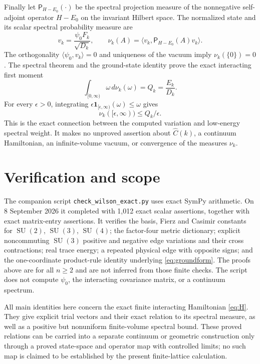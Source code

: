 \documentclass[11pt]{article}
\theoremstyle{definition}
\newcommand{\SU}{\operatorname{SU}}
\begin{document}
Finally let $\mathsf P_{H-E_0}(\cdot)$ be the spectral projection measure
of the nonnegative self-adjoint operator $H-E_0$ on the invariant
Hilbert space. The normalized state and its scalar spectral probability
measure are
\begin{equation}\label{eq:spectralmeasure}
 v_k=\frac{\psi_0F_k}{\sqrt{D_k}},\qquad
 \nu_k(A)=\langle v_k,\mathsf P_{H-E_0}(A)v_k\rangle.
\end{equation}
The orthogonality $\langle\psi_0,v_k\rangle=0$ and uniqueness of the
vacuum imply $\nu_k(\{0\})=0$. The spectral theorem and the ground-state
identity prove the exact interacting first moment
\begin{equation}\label{eq:firstmoment}
 \int_{[0,\infty)}\omega\,d\nu_k(\omega)=Q_k=\frac{E_k}{D_k}.
\end{equation}
For every $\epsilon>0$, integrating
$\epsilon\mathbf 1_{[\epsilon,\infty)}(\omega)\leq\omega$ gives
\[
 \nu_k([\epsilon,\infty))\leq Q_k/\epsilon.
\]
This is the exact connection between the computed variation and
low-energy spectral weight. It makes no unproved assertion about
$\widehat C(k)$, a continuum Hamiltonian, an infinite-volume vacuum,
or convergence of the measures $\nu_k$.

\section{Verification and scope}

The companion script \texttt{check\_wilson\_exact.py} uses exact SymPy
arithmetic. On 8 September 2026 it completed with 1,012 exact scalar
assertions, together with exact matrix-entry assertions. It verifies
the basis, Fierz and Casimir constants for $\SU(2)$, $\SU(3)$, $\SU(4)$;
the factor-four metric dictionary; explicit noncommuting $\SU(3)$
positive and negative edge variations and their cross contractions;
real trace energy; a repeated physical edge with opposite signs;
and the one-coordinate product-rule identity underlying
\eqref{eq:groundform}. The proofs above are for all $n\geq2$ and are
not inferred from those finite checks. The script does not compute
$\psi_0$, the interacting covariance matrix, or a continuum spectrum.

All main identities here concern the exact finite interacting
Hamiltonian \eqref{eq:H}. They give explicit trial vectors and their
exact relation to its spectral measure, as well as a positive but
nonuniform finite-volume spectral bound. These proved relations can
be carried into a separate continuum or geometric construction only
through a proved state-space and operator map with controlled limits;
no such map is claimed to be established by the present finite-lattice
calculation.
\end{document}

